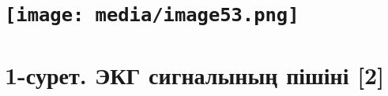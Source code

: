 \documentclass[
]{article}
\begin{document}
\section{\texorpdfstring{\protect\texttt{[image: media/image53.png]}}{}}\label{section}

\section{}\label{section-1}

\section{}\label{section-2}

\section{}\label{section-3}

\section{}\label{section-4}

\section{}\label{section-5}

\section{}\label{section-6}

\section{}\label{section-7}

\section{}\label{section-8}

\section{\texorpdfstring{\textbf{1-сурет. ЭКГ сигналының пішіні
{[}2{]}}}{1-сурет. ЭКГ сигналының пішіні {[}2{]}}}\label{ux441ux443ux440ux435ux442.-ux44dux43aux433-ux441ux438ux433ux43dux430ux43bux44bux43dux44bux4a3-ux43fux456ux448ux456ux43dux456-2}
\end{document}
